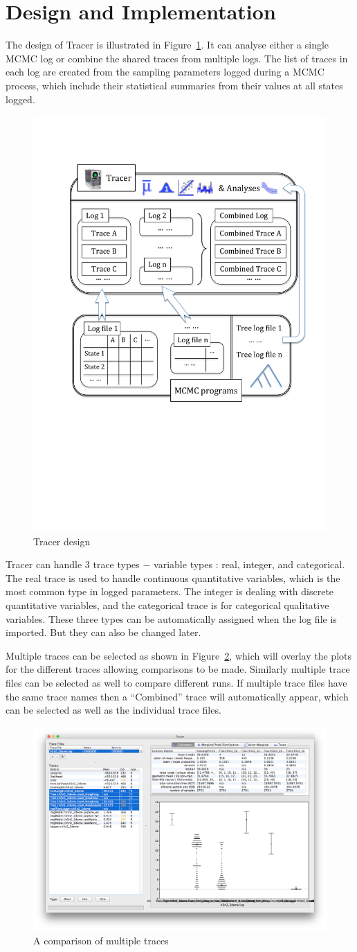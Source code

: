 \documentclass{bioinfo}
\begin{document}
\section*{Design and Implementation}

The design of Tracer is illustrated in Figure~\ref{fig:tracer}. It can analyse either a single MCMC log or combine the shared traces from multiple logs. 
The list of traces in each log are created from the sampling parameters logged during a MCMC process, which include their statistical summaries from their values at all states logged. 

\begin{figure}[ht]
\includegraphics[width=.38\textwidth]{./figures/tracer.pdf}  
\caption{Tracer design}
\label{fig:tracer}
\end{figure}

Tracer can handle 3 trace types $-$ variable types \citep{mendenhall2012introduction}: real, integer, and categorical.
The real trace is used to handle continuous quantitative variables, which is the most common type in logged parameters.
The integer is dealing with discrete quantitative variables, and the categorical trace is for categorical qualitative variables. 
These three types can be automatically assigned when the log file is imported. But they can also be changed later. 

Multiple traces can be selected as shown in Figure~\ref{fig:multitrace}, which will overlay the plots for the different traces allowing comparisons to be made. Similarly multiple trace files can be selected as well to compare different runs. If multiple trace files have the same trace names then a ``Combined'' trace will automatically appear, which can be selected as well as the individual trace files.

\begin{figure}[ht]
\includegraphics[width=.5\textwidth]{./figures/multitrace.png}  
\caption{A comparison of multiple traces}
\label{fig:multitrace}
\end{figure}
\end{document}
